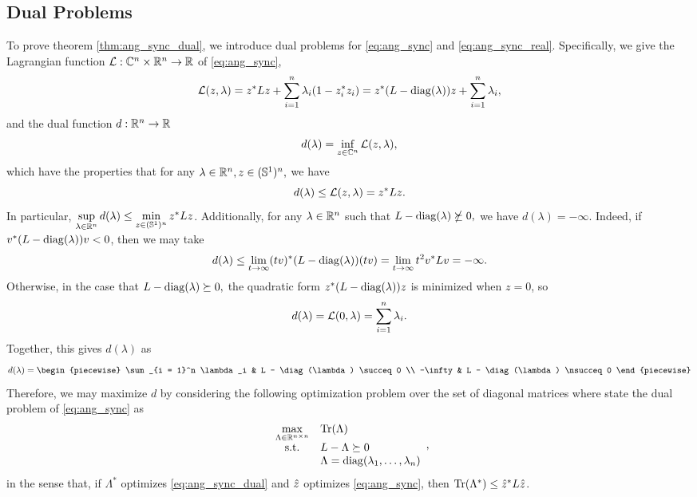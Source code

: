 \subsection{Dual Problems}
To prove theorem \ref{thm:ang_sync_dual}, we introduce dual problems for \eqref{eq:ang_sync} and \eqref{eq:ang_sync_real}.  Specifically, we give the Lagrangian function $\mathcal{L} : \mathbb{C}^n \times \mathbb{R}^n \to \mathbb{R}$ of \eqref{eq:ang_sync}, \[\mathcal{L}(z, \lambda) = z^* L z + \sum_{i = 1}^n \lambda_i (1 - z_i^* z_i) = z^*(L - \operatorname{diag}(\lambda)) z + \sum_{i = 1}^n \lambda_i,\] and the dual function $d : \mathbb{R}^n \to \mathbb{R}$ \[d(\lambda) = \inf_{z \in \mathbb{C}^n} \mathcal{L}(z, \lambda),\] which have the properties that for any $\lambda \in \mathbb{R}^n, z \in (\mathbb{S}^1)^n,$ we have \[d(\lambda) \le \mathcal{L}(z, \lambda) = z^* L z.\]  In particular, $\sup\limits_{\lambda \in \mathbb{R}^n} d(\lambda) \le \min\limits_{z \in (\mathbb{S}^1)^n} z^* L z$.  Additionally, for any $\lambda \in \mathbb{R}^n$ such that $L - \operatorname{diag}(\lambda) \nsucceq 0,$ we have $d(\lambda) = - \infty$.  Indeed, if $v^*(L - \operatorname{diag}(\lambda))v < 0$, then we may take \[d(\lambda) \le \lim_{t \to \infty} (tv)^* (L - \operatorname{diag}(\lambda)) (tv) = \lim_{t \to \infty} t^2 v^* L v = -\infty.\]  Otherwise, in the case that $L - \operatorname{diag}(\lambda) \succeq 0,$ the quadratic form $z^* (L - \operatorname{diag}(\lambda)) z$ is minimized when $z = 0$, so \[d(\lambda) = \mathcal{L}(0, \lambda) = \sum_{i = 1}^n \lambda_i.\]  Together, this gives $d(\lambda)$ as \[d(\lambda) = \begin{piecewise} \sum_{i = 1}^n \lambda_i & L - \diag(\lambda) \succeq 0 \\ -\infty & L - \diag(\lambda) \nsucceq 0 \end{piecewise}\]   Therefore, we may maximize $d$ by considering the following optimization problem over the set of diagonal matrices where state the dual problem of \eqref{eq:ang_sync} as
\begin{equation}
  \begin{array}{cl} \max\limits_{\Lambda \in \mathbb{R}^{n \times n}} & \operatorname{Tr}(\Lambda) \\
    \text{s.t.} & L - \Lambda \succeq 0 \\
    & \Lambda = \operatorname{diag}(\lambda_1, \ldots, \lambda_n)
  \end{array}, \label{eq:ang_sync_dual}
\end{equation}
in the sense that, if $\Lambda^*$ optimizes \eqref{eq:ang_sync_dual} and $\hat{z}$ optimizes \eqref{eq:ang_sync}, then $\operatorname{Tr}(\Lambda^*) \le \hat{z}^* L \hat{z}$.  

